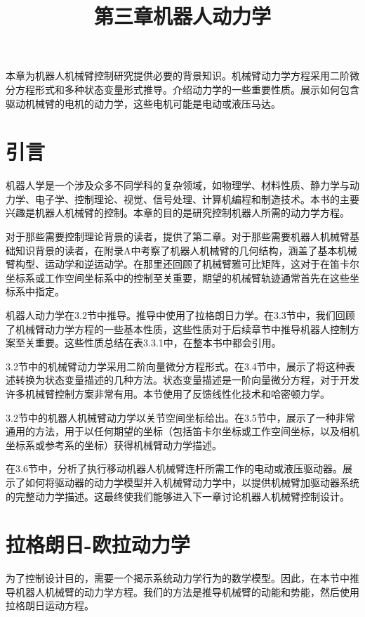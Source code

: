 \documentclass[12pt,a4paper]{ctexart}
\title{第三章\quad 机器人动力学}
\author{}
\date{}
\begin{document}
  \maketitle
\fi

本章为机器人机械臂控制研究提供必要的背景知识。机械臂动力学方程采用二阶微分方程形式和多种状态变量形式推导。介绍动力学的一些重要性质。展示如何包含驱动机械臂的电机的动力学，这些电机可能是电动或液压马达。

\section{引言}

机器人学是一个涉及众多不同学科的复杂领域，如物理学、材料性质、静力学与动力学、电子学、控制理论、视觉、信号处理、计算机编程和制造技术。本书的主要兴趣是机器人机械臂的控制。本章的目的是研究控制机器人所需的动力学方程。

对于那些需要控制理论背景的读者，提供了第二章。对于那些需要机器人机械臂基础知识背景的读者，在附录A中考察了机器人机械臂的几何结构，涵盖了基本机械臂构型、运动学和逆运动学。在那里还回顾了机械臂雅可比矩阵，这对于在笛卡尔坐标系或工作空间坐标系中的控制至关重要，期望的机械臂轨迹通常首先在这些坐标系中指定。

机器人动力学在3.2节中推导。推导中使用了拉格朗日力学。在3.3节中，我们回顾了机械臂动力学方程的一些基本性质，这些性质对于后续章节中推导机器人控制方案至关重要。这些性质总结在表3.3.1中，在整本书中都会引用。

3.2节中的机械臂动力学采用二阶向量微分方程形式。在3.4节中，展示了将这种表述转换为状态变量描述的几种方法。状态变量描述是一阶向量微分方程，对于开发许多机械臂控制方案非常有用。本节使用了反馈线性化技术和哈密顿力学。

3.2节中的机器人机械臂动力学以关节空间坐标给出。在3.5节中，展示了一种非常通用的方法，用于以任何期望的坐标（包括笛卡尔坐标或工作空间坐标，以及相机坐标系或参考系的坐标）获得机械臂动力学描述。

在3.6节中，分析了执行移动机器人机械臂连杆所需工作的电动或液压驱动器。展示了如何将驱动器的动力学模型并入机械臂动力学中，以提供机械臂加驱动器系统的完整动力学描述。这最终使我们能够进入下一章讨论机器人机械臂控制设计。

\section{拉格朗日-欧拉动力学}

为了控制设计目的，需要一个揭示系统动力学行为的数学模型。因此，在本节中推导机器人机械臂的动力学方程。我们的方法是推导机械臂的动能和势能，然后使用拉格朗日运动方程。
\end{document}
